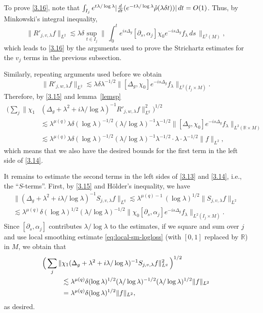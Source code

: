 \documentclass[10pt]{amsart}
\newcommand{\la}{\lambda}
\newcommand{\1}{{\bf 1}}
\newcommand{\R}{{\mathbb R}}
\begin{document}
To prove \eqref{3.16}, note that {$\int_{I_j}e^{t\la/\log\la} |\tfrac{d}{dt}(e^{-t \la/\log\la}\Hat \rho(\la\delta t))| \, dt =O(1)$}.  Thus, by Minkowski's integral inequality,
$$\| R'_{j,v,\la}f \|_{L^2} \lesssim \la\delta\sup_{t\in I_j} \bigl\| \, \int_0^t e^{is\Delta_g} [\partial_s,\alpha_j] \chi_0 e^{-is\Delta_g} f_\la \, ds \, \bigr\|_{L^2(M)},
$$
which leads to \eqref{3.16} by the arguments used to prove the Strichartz estimates for the $v_j$ terms in the previous subsection.


Similarly, repeating arguments used before we obtain
$$\| R'_{j,w,\la}f \|_{L^2} \lesssim \la\delta\la^{-1/2} \|[\Delta_g,\chi_0] e^{-is\Delta_g}f_\la \|_{L^2(I_j\times M)}.$$
Therefore, by \eqref{3.15} and lemma~\ref{lemsp}
\begin{align*}
\bigl(\sum_j \|\chi_1& (\Delta_g+\la^2+i\la/\log\la)^{-1} R'_{j,w,\la}f \|^2_{L^q}\bigr)^{1/2}\\
& \lesssim \la^{\mu(q)}\la\delta(\log\la)^{-1/2}(\la/\log\la)^{-1}\la^{-1/2}\| [\Delta_g,\chi_0]e^{-is\Delta_g}f_\la\|_{L^2(\R\times M)}
\\
&\lesssim \la^{\mu(q)} \la\delta(\log\la)^{-1/2}(\la/\log\la)^{-1}\la^{-1/2}\cdot \la\cdot \la^{-1/2}\|f\|_{L^2},
\end{align*}
which  
means that we also have the desired bounds for the first term in the left side of \eqref{3.14}.


It remains to estimate the second terms in the left sides of \eqref{3.13} and \eqref{3.14},
i.e., the ``$S$-terms''.
First, by \eqref{3.15} and H\"older's inequality, we have
\begin{multline*}
\| (\Delta_g+\la^2+i\la/\log\la)^{-1}S_{j,v,\la}f \|_{L^q} \lesssim \la^{\mu(q)-1} \, (\log\la)^{1/2}  \| S_{j,v,\la}f\|_{L^2}
\\
\lesssim \la^{\mu(q)}\delta(\log\la)^{1/2}(\la/\log\la)^{-1/2}\|\chi_0 [\partial_s,\alpha_j]e^{-is\Delta_g}f_\la\|_{L^2(I_j\times M)}.
\end{multline*}
  Since $[\partial_s,\alpha_j]$ contributes $\la/\log\la$ to the estimates, if we square and sum over $j$ and use local smoothing estimate  \eqref{eq:local-sm-logloss} (with $[0,1]$ replaced by $\mathbb{R}$) in $M$, we obtain that
\begin{align*}
\Bigl(\, \sum_j \|&\chi_1(\Delta_g+\la^2+i\la/\log\la)^{-1} S_{j,v,\la}f \|^2_{L^q} \, \Bigr)^{1/2} 
\\
&\lesssim \la^{\mu(q)}\delta (\log\la)^{1/2}(\la/\log\la)^{-1/2}(\la/\log\la)^{1/2}\|f\|_{L^2}
\\
&=\la^{\mu(q)}\delta(\log\la)^{1/2}  \|f\|_{L^2},
\end{align*}
as desired.
\end{document}
